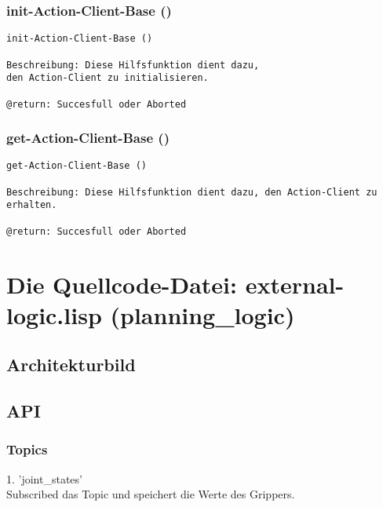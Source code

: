 \documentclass{suturo}
\begin{document}
\subsubsection{init-Action-Client-Base ()}
\begin{verbatim}
init-Action-Client-Base ()

Beschreibung: Diese Hilfsfunktion dient dazu, 
den Action-Client zu initialisieren.

@return: Succesfull oder Aborted
\end{verbatim}

\subsubsection{get-Action-Client-Base ()}
\begin{verbatim}
get-Action-Client-Base ()

Beschreibung: Diese Hilfsfunktion dient dazu, den Action-Client zu erhalten.

@return: Succesfull oder Aborted
\end{verbatim}






\section{Die Quellcode-Datei: external-logic.lisp (planning\_logic)}
\subsection{Architekturbild}


\begin{figure}[!htb]
\end{figure}


\subsection{API}
\subsubsection{Topics}
1. 'joint\_states' \\
Subscribed das Topic und speichert die Werte des Grippers.\\
 
\end{document}
